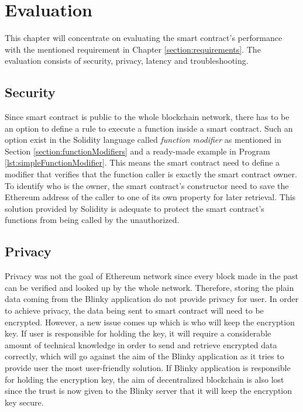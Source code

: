\documentclass[twoside,numperchapter]{tutthesis} %
\begin{document}
\chapter{Evaluation}
\label{ch:evaluation}

This chapter will concentrate on evaluating the smart contract's performance with the mentioned requirement in Chapter \ref{section:requirements}. The evaluation consists of security, privacy, latency and troubleshooting.

\section{Security}
\label{section:security}

Since smart contract is public to the whole blockchain network, there has to be an option to define a rule to execute a function inside a smart contract. Such an option exist in the Solidity language called \textit{function modifier} as mentioned in Section \ref{section:functionModifiers} and a ready-made example in Program \ref{lst:simpleFunctionModifier}. This means the smart contract need to define a modifier that verifies that the function caller is exactly the smart contract owner. To identify who is the owner, the smart contract's constructor need to save the Ethereum address of the caller to one of its own property for later retrieval. This solution provided by Solidity is adequate to protect the smart contract's functions from being called by the unauthorized.

\section{Privacy}

Privacy was not the goal of Ethereum network since every block made in the past can be verified and looked up by the whole network. Therefore, storing the plain data coming from the Blinky application do not provide privacy for user. In order to achieve privacy, the data being sent to smart contract will need to be encrypted. However, a new issue comes up which is who will keep the encryption key. If user is responsible for holding the key, it will require a considerable amount of technical knowledge in order to send and retrieve encrypted data correctly, which will go against the aim of the Blinky application as it tries to provide user the most user-friendly solution. If Blinky application is responsible for holding the encryption key, the aim of decentralized blockchain is also lost since the trust is now given to the Blinky server that it will keep the encryption key secure.
\end{document}
